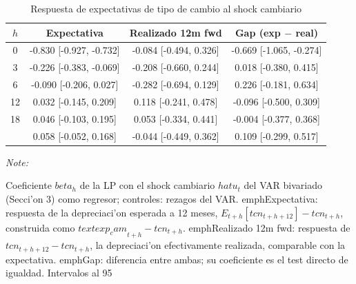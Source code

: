 \begin{table}[!h]
\centering
\caption{\label{tab:p8_tcn}Respuesta de expectativas de tipo de cambio al shock cambiario}
\centering
\begin{threeparttable}
\begin{tabular}[t]{cccc}
\toprule
$h$ & Expectativa & Realizado 12m fwd & Gap (exp $-$ real)\\
\midrule
0 & -0.830 [-0.927, -0.732] & -0.084 [-0.494, 0.326] & -0.669 [-1.065, -0.274]\\
3 & -0.226 [-0.383, -0.069] & -0.208 [-0.660, 0.244] & 0.018 [-0.380, 0.415]\\
6 & -0.090 [-0.206, 0.027] & -0.282 [-0.694, 0.129] & 0.226 [-0.181, 0.634]\\
12 & 0.032 [-0.145, 0.209] & 0.118 [-0.241, 0.478] & -0.096 [-0.500, 0.309]\\
18 & 0.046 [-0.103, 0.195] & 0.053 [-0.334, 0.441] & -0.004 [-0.377, 0.368]\\
\addlinespace
24 & 0.058 [-0.052, 0.168] & -0.044 [-0.449, 0.362] & 0.109 [-0.299, 0.517]\\
\bottomrule
\end{tabular}
\begin{tablenotes}
\item \textit{Note: } 
\item Coeficiente $beta_h$ de la LP con el shock cambiario $hat u_t$ del VAR bivariado (Secci'on 3) como regresor; controles: rezagos del VAR. emph{Expectativa}: respuesta de la depreciaci'on esperada a 12 meses, $E_{t+h}[tcn_{t+h+12}]-tcn_{t+h}$, construida como $text{exp_cam}_{t+h}-tcn_{t+h}$. emph{Realizado 12m fwd}: respuesta de $tcn_{t+h+12}-tcn_{t+h}$, la depreciaci'on efectivamente realizada, comparable con la expectativa. emph{Gap}: diferencia entre ambas; su coeficiente es el test directo de igualdad. Intervalos al 95%
\end{tablenotes}
\end{threeparttable}
\end{table}